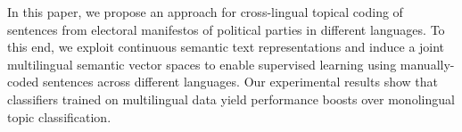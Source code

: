 In this paper, we propose an approach for cross-lingual topical coding of sentences from electoral manifestos of political parties in different languages. To this end, we exploit continuous semantic text representations and induce a joint multilingual semantic vector spaces to enable supervised learning using manually-coded sentences across different languages. Our experimental results show that classifiers trained on multilingual data yield performance boosts over monolingual topic classification.
